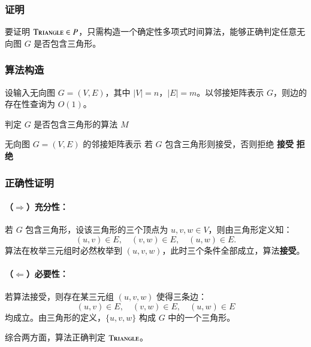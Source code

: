 \begin{answerred}
\subsubsection*{证明}
 
要证明 $\textsc{Triangle} \in P$，只需构造一个确定性多项式时间算法，能够正确判定任意无向图 $G$ 是否包含三角形。
 
\subsubsection*{算法构造}
 
设输入无向图 $G = (V, E)$，其中 $|V| = n$，$|E| = m$。以邻接矩阵表示 $G$，则边的存在性查询为 $O(1)$。
 
\begin{myalgo}{判定 $G$ 是否包含三角形的算法 $M$}
\begin{algorithmic}[1]
  \Require 无向图 $G = (V, E)$ 的邻接矩阵表示
  \Ensure 若 $G$ 包含三角形则接受，否则拒绝
      \State \textbf{接受}
    \EndIf
  \EndFor
  \State \textbf{拒绝}
\end{algorithmic}
\end{myalgo}
 
\subsubsection*{正确性证明}
 
\paragraph{（$\Rightarrow$）充分性：}
若 $G$ 包含三角形，设该三角形的三个顶点为 $u, v, w \in V$，则由三角形定义知：
\[
  (u,v) \in E, \quad (v,w) \in E, \quad (u,w) \in E.
\]
算法在枚举三元组时必然枚举到 $(u, v, w)$，此时三个条件全部成立，算法\textbf{接受}。
 
\paragraph{（$\Leftarrow$）必要性：}
若算法接受，则存在某三元组 $(u, v, w)$ 使得三条边：
\[
  (u,v) \in E, \quad (v,w) \in E, \quad (u,w) \in E
\]
均成立。由三角形的定义，$\{u, v, w\}$ 构成 $G$ 中的一个三角形。
 
综合两方面，算法正确判定 $\textsc{Triangle}$。
 

\end{answerred}
